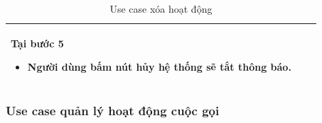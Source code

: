 \documentclass[12pt,a4paper]{article}
\begin{document}
\begin{table}[H]
\begin{tabular}{|p{3.5cm}|p{11.5cm}|c|}
            Tại bước 5\newline
            \vspace{-.8cm}\begin{itemize}
                              \item Người dùng bấm nút hủy hệ thống sẽ tắt thông báo.
            \end{itemize} \\
            \hline
        \end{tabular}
        \caption{Use case xóa hoạt động }

    \end{table}


    \subsubsection*{Use case quản lý hoạt động cuộc gọi}
\end{document}
